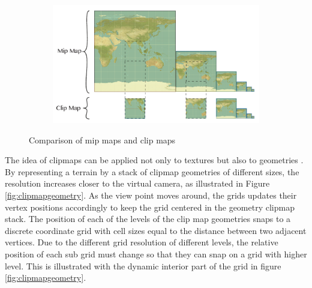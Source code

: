 \begin{figure}[htbp]
    \centering
    \begin{subfigure}[bt]{0.8\textwidth}
        \includegraphics[width=\textwidth]{figures/geometryclipmap/clipmap_mipmap.pdf}
    \end{subfigure}
    \caption{Comparison of mip maps and clip maps}
    \label{fig:clipmapmipmap}
\end{figure}

The idea of clipmaps can be applied not only to textures but also to geometries \cite{tanner98}. By representing a terrain by a stack of clipmap geometries of different sizes, the resolution increases closer to the virtual camera, as illustrated in Figure \ref{fig:clipmapgeometry}. As the view point moves around, the grids updates their vertex positions accordingly to keep the grid centered in the geometry clipmap stack. The position of each of the levels of the clip map geometries snaps to a discrete coordinate grid with cell sizes equal to the distance between two adjacent vertices. Due to the different grid resolution of different levels, the relative position of each sub grid must change so that they can snap on a grid with higher level. This is illustrated with the dynamic interior part of the grid in figure \ref{fig:clipmapgeometry}.

